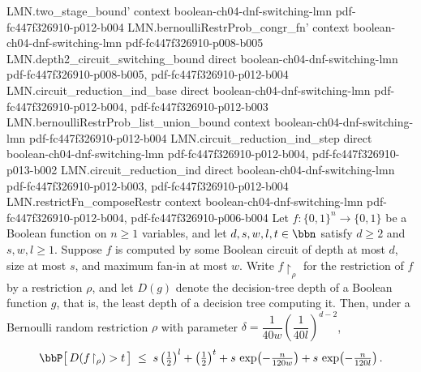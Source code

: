\begin{theorem}
\proofstep
  {LMN.two_stage_bound'}
  {context}
  {boolean-ch04-dnf-switching-lmn}
  {pdf-fc447f326910-p012-b004}
\proofstep
  {LMN.bernoulliRestrProb_congr_fn'}
  {context}
  {boolean-ch04-dnf-switching-lmn}
  {pdf-fc447f326910-p008-b005}
\proofstep
  {LMN.depth2_circuit_switching_bound}
  {direct}
  {boolean-ch04-dnf-switching-lmn}
  {pdf-fc447f326910-p008-b005,
    pdf-fc447f326910-p012-b004}
\proofstep
  {LMN.circuit_reduction_ind_base}
  {direct}
  {boolean-ch04-dnf-switching-lmn}
  {pdf-fc447f326910-p012-b004,
    pdf-fc447f326910-p012-b003}
\proofstep
  {LMN.bernoulliRestrProb_list_union_bound}
  {context}
  {boolean-ch04-dnf-switching-lmn}
  {pdf-fc447f326910-p012-b004}
\proofstep
  {LMN.circuit_reduction_ind_step}
  {direct}
  {boolean-ch04-dnf-switching-lmn}
  {pdf-fc447f326910-p012-b004,
    pdf-fc447f326910-p013-b002}
\proofstep
  {LMN.circuit_reduction_ind}
  {direct}
  {boolean-ch04-dnf-switching-lmn}
  {pdf-fc447f326910-p012-b003,
    pdf-fc447f326910-p012-b004}
\proofstep
  {LMN.restrictFn_composeRestr}
  {context}
  {boolean-ch04-dnf-switching-lmn}
  {pdf-fc447f326910-p012-b004,
    pdf-fc447f326910-p006-b004}
Let $f\colon\{0,1\}^n \to \{0,1\}$ be a Boolean function on $n \ge 1$ variables, and let
$d,s,w,l,t \in \bbn$ satisfy $d \ge 2$ and $s,w,l \ge 1$. Suppose $f$ is computed by
some Boolean circuit of depth at most $d$, size at most $s$, and maximum fan-in at most
$w$. Write $f\!\restriction_\rho$ for the restriction of $f$ by a restriction $\rho$,
and let $D(g)$ denote the decision-tree depth of a Boolean function $g$, that is, the
least depth of a decision tree computing it. Then, under a Bernoulli random restriction
$\rho$ with parameter $\delta = \dfrac{1}{40w}\left(\dfrac{1}{40l}\right)^{d-2}$,
\[
  \bbP\bigl[\, D(f\!\restriction_\rho) > t \,\bigr]
  \;\le\; s\left(\tfrac{1}{2}\right)^{l} + \left(\tfrac{1}{2}\right)^{t}
    + s\,\exp\!\left(-\tfrac{n}{120w}\right) + s\,\exp\!\left(-\tfrac{n}{120l}\right).
\]
\end{theorem}

